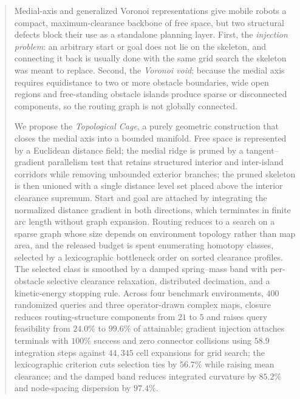 \documentclass[conference]{IEEEtran}
\begin{document}
\begin{abstract}
Medial-axis and generalized Voronoi representations give mobile robots a compact, maximum-clearance backbone of free space, but two structural defects block their use as a standalone planning layer. First, the \emph{injection problem}: an arbitrary start or goal does not lie on the skeleton, and connecting it back is usually done with the same grid search the skeleton was meant to replace. Second, the \emph{Voronoi void}: because the medial axis requires equidistance to two or more obstacle boundaries, wide open regions and free-standing obstacle islands produce sparse or disconnected components, so the routing graph is not globally connected.

We propose the \emph{Topological Cage}, a purely geometric construction that closes the medial axis into a bounded manifold. Free space is represented by a Euclidean distance field; the medial ridge is pruned by a tangent--gradient parallelism test that retains structured interior and inter-island corridors while removing unbounded exterior branches; the pruned skeleton is then unioned with a single distance level set placed above the interior clearance supremum. Start and goal are attached by integrating the normalized distance gradient in both directions, which terminates in finite arc length without graph expansion. Routing reduces to a search on a sparse graph whose size depends on environment topology rather than map area, and the released budget is spent enumerating homotopy classes, selected by a lexicographic bottleneck order on sorted clearance profiles. The selected class is smoothed by a damped spring--mass band with per-obstacle selective clearance relaxation, distributed decimation, and a kinetic-energy stopping rule. Across four benchmark environments, $400$ randomized queries and three operator-drawn complex maps, closure reduces routing-structure components from $21$ to $5$ and raises query feasibility from $24.0\%$ to $99.6\%$ of attainable; gradient injection attaches terminals with $100\%$ success and zero connector collisions using $58.9$ integration steps against $44{,}345$ cell expansions for grid search; the lexicographic criterion cuts selection ties by $56.7\%$ while raising mean clearance; and the damped band reduces integrated curvature by $85.2\%$ and node-spacing dispersion by $97.4\%$.
\end{abstract}

\end{document}
